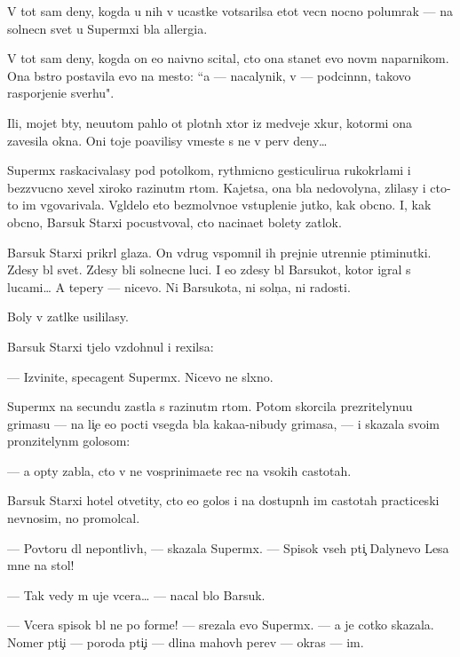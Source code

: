 \documentclass[12pt]{book}
\begin{document}
V tot sam{\yi}{\y} deny, kogda u nih v ucastke votsarilsa etot vecn{\yi}{\y} nocno{\y} polumrak — na solnecn{\yi}{\y} svet u Superm{\yi}xi b{\yi}la allergi{\y}a.

V tot sam{\yi}{\y} deny, kogda on {\y}e{\x}o naivno scital, cto ona stanet {\y}evo nov{\yi}m naparnikom. Ona b{\yi}stro postavila {\y}evo na mesto: ``{\Y}a — nacalynik, v{\yi} — podcin{\e}nn{\yi}{\y}, takovo raspor{\ia}jeni{\y}e sverhu".

Ili, mojet b{\yi}ty, neu{\y}utom pahlo ot plotn{\yi}h xtor iz medvej{\y}e{\y} xkur{\yi}, kotor{\yi}mi ona zavesila okna. Oni toje po{\y}avilisy vmeste s ne{\y} v perv{\yi}{\y} deny…

Superm{\yi}x raskacivalasy pod potolkom, rythmicno gesticuliru{\y}a rukokr{\yi}l{\y}ami i bezzvucno xevel{\ia} xiroko razinut{\yi}m rtom. Kajetsa, ona b{\yi}la nedovolyna, zlilasy i cto-to im v{\yi}govarivala. V{\yi}gl{\ia}delo eto bezmolvno{\y}e v{\yi}stupleni{\y}e jutko, kak ob{\yi}cno. I, kak ob{\yi}cno, Barsuk Starxi{\y} pocustvoval, cto nacina{\y}et bolety zat{\yi}lok.

Barsuk Starxi{\y} prikr{\yi}l glaza. On vdrug vspomnil ih prejni{\y}e utrenni{\y}e p{\ia}timinutki. Zdesy b{\yi}l svet. Zdesy b{\yi}li solnecn{\yi}{\y}e luci. I {\y}e{\x}o zdesy b{\yi}l Barsukot, kotor{\yi}{\y} igral s lucami… A tepery — nicevo. Ni Barsukota, ni soln{\c}a, ni radosti.

Boly v zat{\yi}lke usililasy.

Barsuk Starxi{\y} t{\ia}jelo vzdohnul i rexilsa:

— Izvinite, specagent Superm{\yi}x. Nicevo ne sl{\yi}xno.

Superm{\yi}x na secundu zast{\yi}la s razinut{\yi}m rtom. Potom skorcila prezritelynu{\y}u grimasu — na li{\c}e {\y}e{\y}o pocti vsegda b{\yi}la kaka{\y}a-nibudy grimasa, — i skazala svo{\y}im pronzitelyn{\yi}m golosom:

— {\Y}a op{\ia}ty zab{\yi}la, cto v{\yi} ne vosprinima{\y}ete rec na v{\yi}sokih castotah.

Barsuk Starxi{\y} hotel otvetity, cto {\y}e{\y}o golos i na dostupn{\yi}h im castotah practiceski nev{\yi}nosim, no promolcal.

— Povtor{\ia}{\y}u dl{\ia} nepon{\ia}tliv{\yi}h, — skazala Superm{\yi}x. — Spisok vseh pti{\c} Dalynevo Lesa mne na stol!

— Tak vedy m{\yi} uje vcera… — nacal b{\yi}lo Barsuk.

— Vcera spisok b{\yi}l ne po forme! — srezala {\y}evo Superm{\yi}x. — {\Y}a je cotko skazala. Nomer pti{\c}i — poroda pti{\c}i — dlina mahov{\yi}h per{\y}ev — okras — im{\ia}.
\end{document}
